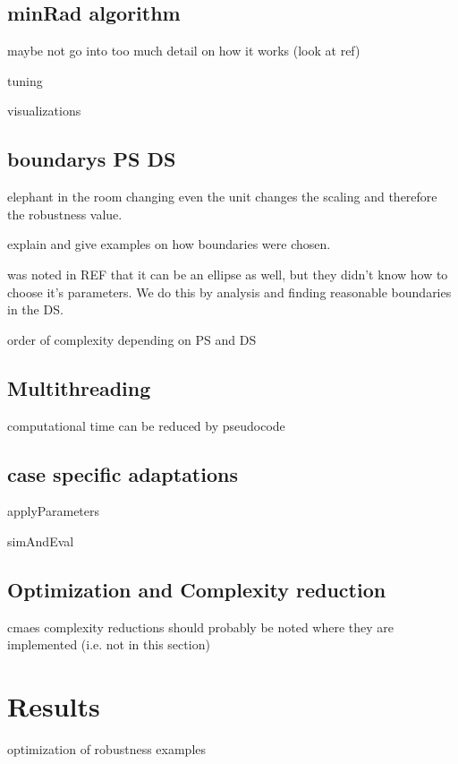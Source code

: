 \subsection{minRad algorithm}

    maybe not go into too much detail on how it works (look at ref)

    tuning

    visualizations

\subsection{boundarys PS DS}

    

    elephant in the room 
    changing even the unit changes the scaling and therefore the robustness value.

    explain and give examples on how boundaries were chosen. 

    was noted in REF that it can be an ellipse as well, but they didn't know how to choose it's parameters. We do this by analysis and finding reasonable boundaries in the DS.

    order of complexity depending on PS and DS

\subsection{Multithreading}
    computational time can be reduced by 
    pseudocode

\subsection{case specific adaptations}
    
    applyParameters

    simAndEval

\subsection{Optimization and Complexity reduction}
    
    cmaes
    complexity reductions should probably be noted where they are implemented (i.e. not in this section)

\section{Results}

    optimization of robustness examples
